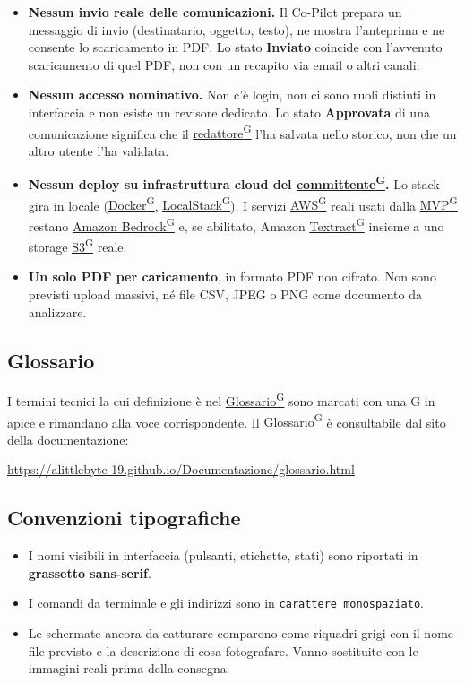 \documentclass[a4paper,12pt]{article}
\providecommand{\glslink}[2]{\href{https://alittlebyte-19.github.io/Documentazione/glossario.html\#gls-#1}{\underline{#2}\textsuperscript{\scriptsize G}}}
\newcommand{\ui}[1]{\textbf{\textsf{#1}}}
\begin{document}
\begin{itemize}
    \item \textbf{Nessun invio reale delle comunicazioni.} Il Co-Pilot prepara un messaggio di invio (destinatario, oggetto, testo), ne mostra l'anteprima e ne consente lo scaricamento in PDF. Lo stato \ui{Inviato} coincide con l'avvenuto scaricamento di quel PDF, non con un recapito via email o altri canali.
    \item \textbf{Nessun accesso nominativo.} Non c'è login, non ci sono ruoli distinti in interfaccia e non esiste un revisore dedicato. Lo stato \ui{Approvata} di una comunicazione significa che il \glslink{redattore}{redattore} l'ha salvata nello storico, non che un altro utente l'ha validata.
    \item \textbf{Nessun deploy su infrastruttura cloud del \glslink{committente-proponente}{committente}.} Lo stack gira in locale (\glslink{docker}{Docker}, \glslink{localstack}{LocalStack}). I servizi \glslink{aws}{AWS} reali usati dalla \glslink{mvp-minimum-viable-product}{MVP} restano \glslink{amazon-bedrock}{Amazon Bedrock} e, se abilitato, Amazon \glslink{textract}{Textract} insieme a uno storage \glslink{s3-simple-storage-service}{S3} reale.
    \item \textbf{Un solo PDF per caricamento}, in formato PDF non cifrato. Non sono previsti upload massivi, né file CSV, JPEG o PNG come documento da analizzare.
\end{itemize}

\subsection{Glossario}

I termini tecnici la cui definizione è nel \glslink{glossario}{Glossario} sono marcati con una G in apice e rimandano alla voce corrispondente. Il \glslink{glossario}{Glossario} è consultabile dal sito della documentazione:

\url{https://alittlebyte-19.github.io/Documentazione/glossario.html}

\subsection{Convenzioni tipografiche}

\begin{itemize}
    \item I nomi visibili in interfaccia (pulsanti, etichette, stati) sono riportati in \ui{grassetto sans-serif}.
    \item I comandi da terminale e gli indirizzi sono in \texttt{carattere monospaziato}.
    \item Le schermate ancora da catturare comparono come riquadri grigi con il nome file previsto e la descrizione di cosa fotografare. Vanno sostituite con le immagini reali prima della consegna.
\end{itemize}
\end{document}
